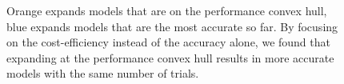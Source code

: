 \documentclass{article}
\begin{document}
\begin{figure}[t]
    \centering
    
    
    \caption{Orange expands models that are on the performance convex hull, 
    blue expands models that are the most accurate so far. By focusing on the cost-efficiency instead of the accuracy alone, we found that expanding at the performance convex hull results in more accurate models with the 
    same number of trials. }
    \label{fig:convex_hull_vs_greedy}
\end{figure}
\end{document}
